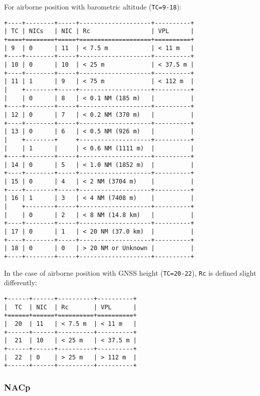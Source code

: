 For airborne position with barometric altitude (\texttt{TC=9-18}):

\begin{verbatim}
+----+--------+-----+--------------------+----------+
| TC | NICs   | NIC | Rc                 | VPL      |
+====+========+=====+====================+==========+
| 9  | 0      | 11  | < 7.5 m            | < 11 m   |
+----+--------+-----+--------------------+----------+
| 10 | 0      | 10  | < 25 m             | < 37.5 m |
+----+--------+-----+--------------------+----------+
| 11 | 1      | 9   | < 75 m             | < 112 m  |
|    +--------+-----+--------------------+----------+
|    | 0      | 8   | < 0.1 NM (185 m)   |          |
+----+--------+-----+--------------------+----------+
| 12 | 0      | 7   | < 0.2 NM (370 m)   |          |
+----+--------+-----+--------------------+----------+
| 13 | 0      | 6   | < 0.5 NM (926 m)   |          |
|    +--------+     +--------------------+----------+
|    | 1      |     | < 0.6 NM (1111 m)  |          |
+----+--------+-----+--------------------+----------+
| 14 | 0      | 5   | < 1.0 NM (1852 m)  |          |
+----+--------+-----+--------------------+----------+
| 15 | 0      | 4   | < 2 NM (3704 m)    |          |
+----+--------+-----+--------------------+----------+
| 16 | 1      | 3   | < 4 NM (7408 m)    |          |
|    +--------+-----+--------------------+----------+
|    | 0      | 2   | < 8 NM (14.8 km)   |          |
+----+--------+-----+--------------------+----------+
| 17 | 0      | 1   | < 20 NM (37.0 km)  |          |
+----+--------+-----+--------------------+----------+
| 18 | 0      | 0   | > 20 NM or Unknown |          |
+----+--------+-----+--------------------+----------+
\end{verbatim}


In the case of airborne position with GNSS height (\texttt{TC=20-22}),
\texttt{Rc} is defined slight differently:

\begin{verbatim}
+------+------+----------+----------+
|  TC  | NIC  | Rc       | VPL      |
+======+======+==========+==========+
|  20  | 11   | < 7.5 m  | < 11 m   |
+------+------+----------+----------+
|  21  | 10   | < 25 m   | < 37.5 m |
+------+------+----------+----------+
|  22  | 0    | > 25 m   | > 112 m  |
+------+------+----------+----------+
\end{verbatim}

\subsubsection{NACp}\label{nacp}

